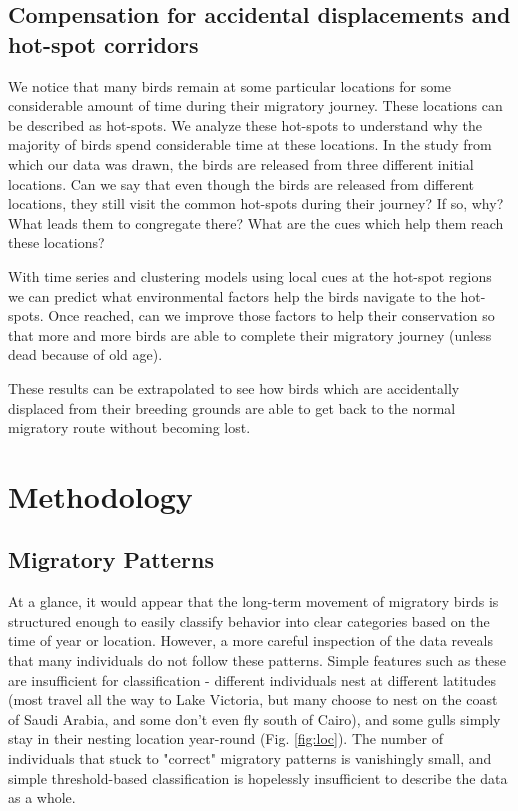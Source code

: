 \documentclass[letterpaper, 10pt, conference]{ieeeconf}  %
\begin{document}
\subsection{Compensation for accidental displacements and hot-spot corridors}
	We notice that many birds remain at some particular locations for some considerable amount of time during their migratory journey. These locations can be described as hot-spots. We analyze these hot-spots to understand why the majority of birds spend considerable time at these locations. In the study from which our data was drawn, the birds are released from three different initial locations. Can we say that even though the birds are released from different locations, they still visit the common hot-spots during their journey? If so, why? What leads them to congregate there? What are the cues which help them reach these locations?

	With time series and clustering models using local cues at the hot-spot regions we can predict what environmental factors help the birds navigate to the hot-spots. Once reached, can we improve those factors to help their conservation so that more and more birds are able to complete their migratory journey (unless dead because of old age).

	These results can be extrapolated to see how birds which are accidentally displaced from their breeding grounds are able to get back to the normal migratory route without becoming lost.

\section{Methodology} \label{methods}
\subsection{Migratory Patterns}
    At a glance, it would appear that the long-term movement of migratory birds is structured enough to easily classify behavior into clear categories based on the time of year or location. However, a more careful inspection of the data reveals that many individuals do not follow these patterns. Simple features such as these are insufficient for classification - different individuals nest at different latitudes (most travel all the way to Lake Victoria, but many choose to nest on the coast of Saudi Arabia, and some don't even fly south of Cairo), and some gulls simply stay in their nesting location year-round (Fig. \ref{fig:loc}). The number of individuals that stuck to "correct" migratory patterns is vanishingly small, and simple threshold-based classification is hopelessly insufficient to describe the data as a whole.
    
\end{document}
